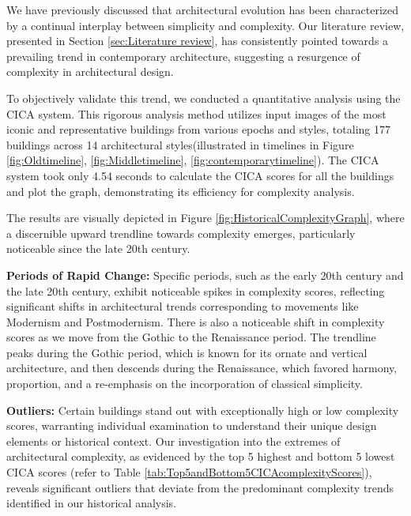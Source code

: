 %    


We have previously discussed that architectural evolution has been characterized by a continual interplay between simplicity and complexity.
Our literature review, presented in Section \ref{sec:Literature review}, has consistently pointed towards a prevailing trend in contemporary architecture, suggesting a resurgence of complexity in architectural design.

To objectively validate this trend, we conducted a quantitative analysis using the CICA system.
This rigorous analysis method utilizes input images of the most iconic and representative buildings from various epochs and styles, totaling 177 buildings across 14 architectural styles(illustrated in timelines in Figure \ref{fig:Oldtimeline}, \ref{fig:Middletimeline}, \ref{fig:contemporarytimeline}).
The CICA system took only 4.54 seconds to calculate the CICA scores for all the buildings and plot the graph, demonstrating its efficiency for complexity analysis.

The results are visually depicted in Figure \ref{fig:HistoricalComplexityGraph}, where a discernible upward trendline towards complexity emerges, particularly noticeable since the late 20th century.

\textbf{Periods of Rapid Change:} Specific periods, such as the early 20th century and the late 20th century, exhibit noticeable spikes in complexity scores, reflecting significant shifts in architectural trends corresponding to movements like Modernism and Postmodernism.
There is also a noticeable shift in complexity scores as we move from the Gothic to the Renaissance period.
The trendline peaks during the Gothic period, which is known for its ornate and vertical architecture, and then descends during the Renaissance, which favored harmony, proportion, and a re-emphasis on the incorporation of classical simplicity.

\textbf{Outliers:} Certain buildings stand out with exceptionally high or low complexity scores, warranting individual examination to understand their unique design elements or historical context.
Our investigation into the extremes of architectural complexity, as evidenced by the top 5 highest and bottom 5 lowest CICA scores (refer to Table \ref{tab:Top5andBottom5CICAcomplexityScores}), reveals significant outliers that deviate from the predominant complexity trends identified in our historical analysis.

